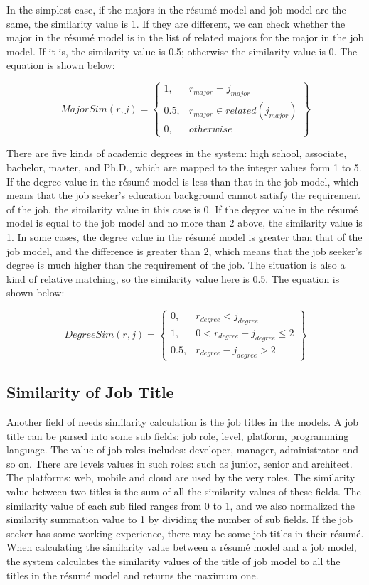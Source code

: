 In the simplest case, if the majors in the r\'esum\'e model and job model are the same, the similarity value is 1. If they are different, we can check whether the major in the r\'esum\'e model is in the list of related majors for the major in the job model. If it is, the similarity value is 0.5; otherwise the similarity value is 0. The equation is shown below:

$$ MajorSim(r,j ) = \begin{Bmatrix}
1, & r_{major} = j_{major} \\
0.5, & r_{major} \in related( j_{major} ) \\
0, & otherwise
\end{Bmatrix} $$

There are five kinds of academic degrees in the system:  high school, associate, bachelor, master, and Ph.D., which are mapped to the integer values form 1 to 5. If the degree value in the r\'esum\'e model is less than that in the job model, which means that the job seeker's education background cannot satisfy the requirement of the job, the similarity value in this case is 0. If the degree value in the r\'esum\'e model is equal to the job model and no more than 2 above, the similarity value is 1. In some cases, the degree value in the r\'esum\'e model is greater than that of the job model, and the difference is greater than 2, which means that the job seeker's degree is much higher than the requirement of the job. The situation is also a kind of relative matching, so the similarity value here is 0.5. The equation is shown below:

$$ DegreeSim(r,j ) = \begin{Bmatrix}
0,   & r_{degree} < j_{degree} \\
1,   & 0 < r_{degree} - j_{degree} \leqslant 2  \\
0.5, & r_{degree} - j_{degree} > 2
\end{Bmatrix} $$

\subsection{Similarity of Job Title}
Another field of needs similarity calculation is the job titles in the models. A job title can be parsed into some sub fields: job role, level, platform, programming language.  The value of job roles includes: developer, manager, administrator and so on. There are levels values in such roles: such as junior, senior and architect. The platforms: web, mobile and cloud are used by the very roles.  The similarity value between two titles is the sum of all the similarity values of these fields. The similarity value of each sub filed ranges from 0 to 1, and we also normalized the similarity summation value to 1 by dividing the number of sub fields. If the job seeker has some working experience, there may be some job titles in their r\'esum\'e.  When calculating the similarity value between a r\'esum\'e model and a job model, the system calculates the similarity values of the title of job model to all the titles in the r\'esum\'e model and returns the maximum one.


